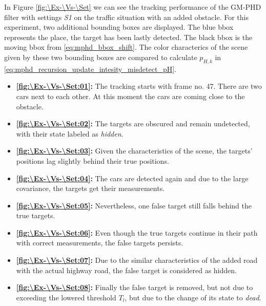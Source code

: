 In Figure \ref{fig:\Ex-\Vs-\Set} we can see the tracking performance of the GM-PHD filter with settings \textit{S1} on the traffic situation with an added obstacle. For this experiment, two additional bounding boxes are displayed. The blue bbox represents the place, the target has been lastly detected. The black bbox is the moving bbox from \eqref{eq:mphd_bbox_shift}. The color characterics of the scene given by these two bounding boxes are compared to calculate $p_{H,k}$ in \eqref{eq:mphd_recursion_update_intesity_misdetect_pH}.
\begin{itemize}
    \item \textbf{\ref{fig:\Ex-\Vs-\Set:01}:} The tracking starts with frame no. 47. There are two cars next to each other. At this moment the cars are coming close to the obstacle.
    \item \textbf{\ref{fig:\Ex-\Vs-\Set:02}:} The targets are obscured and remain undetected, with their state labeled as \textit{hidden}.
    \item \textbf{\ref{fig:\Ex-\Vs-\Set:03}:} Given the characteristics of the scene, the targets' positions lag slightly behind their true positions.
    \item \textbf{\ref{fig:\Ex-\Vs-\Set:04}:} The cars are detected again and due to the large covariance, the targets get their measurements.
    \item \textbf{\ref{fig:\Ex-\Vs-\Set:05}:} Nevertheless, one false target still falls behind the true targets.
    \item \textbf{\ref{fig:\Ex-\Vs-\Set:06}:} Even though the true targets continue in their path with correct measurements, the false targets persists.
    \item \textbf{\ref{fig:\Ex-\Vs-\Set:07}:} Due to the similar characteristics of the added road with the actual highway road, the false target is considered as hidden.
    \item \textbf{\ref{fig:\Ex-\Vs-\Set:08}:} Finally the false target is removed, but not due to exceeding the lowered threshold $T_l$, but due to the change of its state to \textit{dead}.
\end{itemize}

